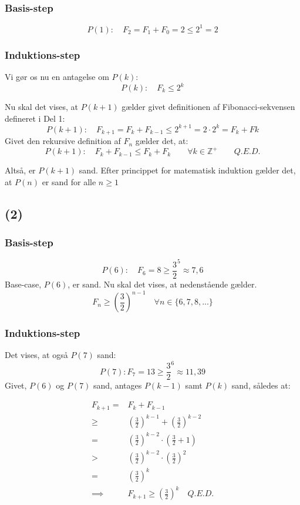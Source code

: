 \documentclass[a4paper,10pt]{article}
\begin{document}
\subsubsection*{Basis-step}
$$
P(1): \quad F_{2} = F_{1} + F_{0} = 2 \leq 2^{1} = 2
$$
\subsubsection*{Induktions-step}
Vi gør os nu en antagelse om $P(k)$:
$$
P(k): \quad F_{k} \leq 2^{k}
$$

Nu skal det vises, at $P(k+1)$ gælder givet definitionen af Fibonacci-sekvensen defineret i Del 1:
$$
P(k+1): \quad F_{k+1} = F_{k} + F_{k-1} \leq 2^{k+1} = 2 \cdot 2^{k} = F_{k} + F{k}
$$
Givet den rekursive definition af $F_{n}$ gælder det, at:
$$
P(k+1): \quad F_{k} + F_{k-1} \leq F_{k} + F_{k}
\quad \quad \forall k \in \mathbb Z^{+} \quad \quad Q.E.D.
$$

Altså, er $P(k+1)$ sand. Efter princippet for matematisk induktion gælder det, at $P(n)$ er sand for alle $n \geq 1$

\subsection*{(2)}
\subsubsection*{Basis-step}
$$
P(6): \quad F_{6} = 8 \geq \frac{3}{2}^{5} \approx 7,6
$$
Base-case, $P(6)$, er sand. Nu skal det vises, at nedenstående gælder. 
$$
F_{n} \geq (\frac{3}{2})^{n-1} \quad \forall n \in \{6, 7, 8,...\}
$$

\subsubsection*{Induktions-step}
Det vises, at også $P(7)$ sand:
$$
P(7) : F_{7} = 13 \geq \frac{3}{2}^6 \approx 11,39
$$
Givet, $P(6)$ og $P(7)$ sand, antages $P(k-1)$ samt $P(k)$ sand, således at:

\begin{equation}
\begin{aligned}	
F_{k+1}	 	= 		& F_{k} + F_{k-1} \\
			\geq	& (\frac{3}{2})^{k-1} + (\frac{3}{2})^{k-2} \\
			=		& (\frac{3}{2})^{k-2} \cdot (\frac{3}{2} + 1) \\
			>		& (\frac{3}{2})^{k-2} \cdot (\frac{3}{2})^{2} \\
			=		& (\frac{3}{2})^{k} \\
			\implies & F_{k+1} \geq (\frac{3}{2})^{k} \quad Q.E.D.
\end{aligned}
\end{equation}
\end{document}
